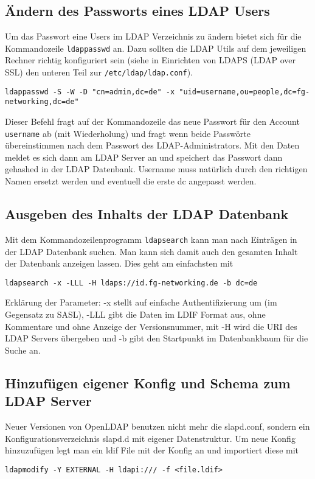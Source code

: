 \documentclass[11pt,a4paper,titlepage=firstiscover]{scrartcl} %
\begin{document}
\subsection{Ändern des Passworts eines LDAP Users}
Um das Passwort eine Users im LDAP Verzeichnis zu ändern bietet sich für die Kommandozeile \texttt{ldappasswd} an. Dazu sollten die LDAP Utils auf dem jeweiligen Rechner richtig konfiguriert sein (siehe in Einrichten von LDAPS (LDAP over SSL) den unteren Teil zur \texttt{/etc/ldap/ldap.conf}).
\begin{lstlisting}
ldappasswd -S -W -D "cn=admin,dc=de" -x "uid=username,ou=people,dc=fg-networking,dc=de"
\end{lstlisting}
Dieser Befehl fragt auf der Kommandozeile das neue Passwort für den Account \texttt{username} ab (mit Wiederholung) und fragt wenn beide Passwörte übereinstimmen nach dem Passwort des LDAP-Administrators. Mit den Daten meldet es sich dann am LDAP Server an und speichert das Passwort dann gehashed in der LDAP Datenbank. Username muss natürlich durch den richtigen Namen ersetzt werden und eventuell die erste dc angepasst werden.

\subsection{Ausgeben des Inhalts der LDAP Datenbank}
Mit dem Kommandozeilenprogramm \texttt{ldapsearch} kann man nach Einträgen in der LDAP Datenbank suchen. Man kann sich damit auch den gesamten Inhalt der Datenbank anzeigen lassen. Dies geht am einfachsten mit
\begin{lstlisting}
ldapsearch -x -LLL -H ldaps://id.fg-networking.de -b dc=de
\end{lstlisting}
Erklärung der Parameter: -x stellt auf einfache Authentifizierung um (im Gegensatz zu SASL), -LLL gibt die Daten im LDIF Format aus, ohne Kommentare und ohne Anzeige der Versionsnummer, mit -H wird die URI des LDAP Servers übergeben und -b gibt den Startpunkt im Datenbankbaum für die Suche an.


\subsection{Hinzufügen eigener Konfig und Schema zum LDAP Server}
Neuer Versionen von OpenLDAP benutzen nicht mehr die slapd.conf, sondern ein Konfigurationsverzeichnis slapd.d mit eigener Datenstruktur.
Um neue Konfig hinzuzufügen legt man ein ldif File mit der Konfig an und importiert diese mit
\begin{lstlisting}
ldapmodify -Y EXTERNAL -H ldapi:/// -f <file.ldif> 
\end{lstlisting}
\end{document}
